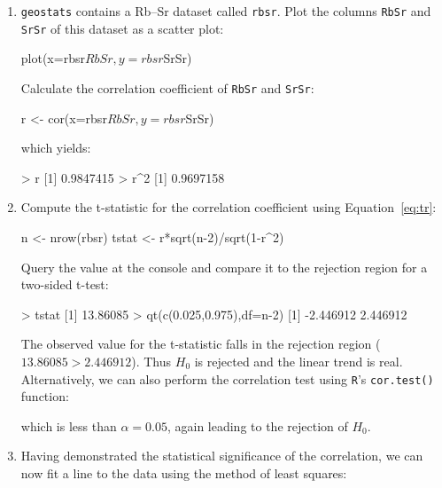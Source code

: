 \begin{enumerate}

\item \texttt{geostats} contains a Rb--Sr dataset called
  \texttt{rbsr}.  Plot the columns \texttt{RbSr} and \texttt{SrSr} of
  this dataset as a scatter plot:

\begin{script}
plot(x=rbsr$RbSr,y=rbsr$SrSr)
\end{script}

Calculate the correlation coefficient of \texttt{RbSr} and
\texttt{SrSr}:

\begin{script}[firstnumber=2]
r <- cor(x=rbsr$RbSr,y=rbsr$SrSr)
\end{script}

\noindent which yields:

\begin{console}
> r
[1] 0.9847415
> r^2
[1] 0.9697158
\end{console}

\item Compute the t-statistic for the correlation coefficient using
  Equation~\ref{eq:tr}:

\begin{script}[firstnumber=3]
n <- nrow(rbsr)
tstat <- r*sqrt(n-2)/sqrt(1-r^2)
\end{script}

\noindent Query the value at the console and compare it to the
rejection region for a two-sided t-test:

\begin{console}
> tstat
[1] 13.86085
> qt(c(0.025,0.975),df=n-2)
[1] -2.446912  2.446912
\end{console}

\noindent The observed value for the t-statistic falls in the
rejection region ($13.86085 > 2.446912$). Thus $H_0$ is rejected and
the linear trend is real. Alternatively, we can also perform the
correlation test using \texttt{R}'s \texttt{cor.test()} function:


\noindent which is less than $$, again leading to the
rejection of $H_0$.

\item Having demonstrated the statistical significance of the
  correlation, we can now fit a line to the data using the method of
  least squares:


\end{enumerate}

